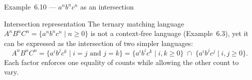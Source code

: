 \begin{frame}[t]{Example 6.10 — $a^n b^n c^n$ as an intersection}
  \begin{texample}{Intersection representation}
    The ternary matching language $A^n B^n C^n = \{a^n b^n c^n \mid n\ge 0\}$ is not a
    context‑free language (Example 6.3), yet it can be expressed as the
    intersection of two simpler languages:
    \[
      A^n B^n C^n
      = \{a^i b^j c^k \mid i=j \text{ and } j=k\}
      = \{a^i b^i c^k \mid i,k\ge 0\}\;\cap\;\{a^i b^j c^j \mid i,j\ge 0\}.
    \]
    Each factor enforces one equality of counts while allowing the other
    count to vary.
  \end{texample}
  \label{fr:6.2-02}
\end{frame}

